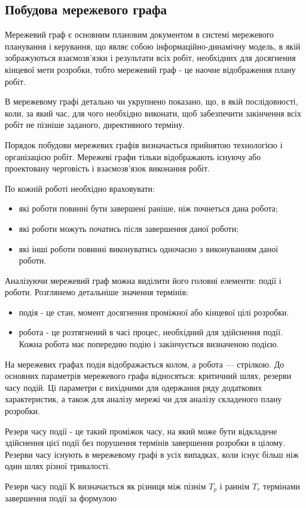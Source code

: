\subsection{Побудова мережевого графа}
Мережевий граф є основним плановим документом в системі мережевого планування і керування, що являє собою інформаційно-динамічну модель, в якій зображуються взаємозв'язки і результати всіх робіт, необхідних для досягнення кінцевої мети розробки, тобто мережевий граф - це наочне відображення плану робіт.
\par В мережевому графі детально чи укрупнено показано, що, в якій послідовності, коли, за який час, для чого необхідно виконати, щоб забезпечити закінчення всіх робіт не пізніше заданого, директивного терміну.
\par Порядок побудови мережевих графів визначається прийнятою технологією і організацією робіт. Мережеві графи тільки відображають існуючу або проектовану черговість і взаємозв'язок виконання робіт.
\par По кожній роботі необхідно враховувати:
\begin{itemize}
	\item які роботи повинні бути завершені раніше, ніж почнеться дана робота;
	\item які роботи можуть початись після завершення даної роботи;
	\item які інші роботи повинні виконуватись одночасно з виконуванням даної роботи.
\end{itemize}
\par Аналізуючи мережевий граф можна виділити його головні елементи: події і роботи. Розглянемо детальніше значення термінів:
\begin{itemize}
	\item подія - це стан, момент досягнення проміжної або кінцевої цілі розробки.
	\item робота - це розтягнений в часі процес, необхідний для здійснення події. Кожна робота має попередню подію і закінчується визначеною подією.
\end{itemize}

\par На мережевих графах подія відображається колом, а робота --- стрілкою. До основних параметрів мережевого графа відносяться: критичний шлях, резерви часу подій. Ці параметри є вихідними для одержання ряду додаткових характеристик, а також для аналізу мережі чи для аналізу складеного плану розробки.
\par Резерв часу події - це такий проміжок часу, на який може бути відкладене здійснення цієї події без порушення термінів завершення розробки в цілому. Резерви часу існують в мережевому графі в усіх випадках, коли існує більш ніж один шлях різної тривалості.
\par Резерв часу події К визначається як різниця між пізнім $T_{p}$ і раннім $T_{r}$ термінами завершення події за формулою

